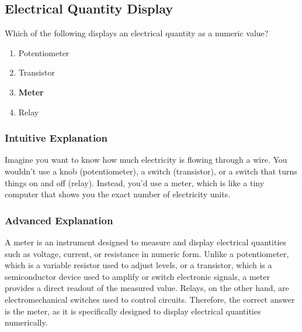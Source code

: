 \subsection{Electrical Quantity Display}
\label{T6D04}

\begin{tcolorbox}[colback=gray!10!white,colframe=black!75!black,title=T6D04]
Which of the following displays an electrical quantity as a numeric value?
\begin{enumerate}[noitemsep]
    \item Potentiometer
    \item Transistor
    \item \textbf{Meter}
    \item Relay
\end{enumerate}
\end{tcolorbox}

\subsubsection*{Intuitive Explanation}
Imagine you want to know how much electricity is flowing through a wire. You wouldn't use a knob (potentiometer), a switch (transistor), or a switch that turns things on and off (relay). Instead, you'd use a meter, which is like a tiny computer that shows you the exact number of electricity units.

\subsubsection*{Advanced Explanation}
A meter is an instrument designed to measure and display electrical quantities such as voltage, current, or resistance in numeric form. Unlike a potentiometer, which is a variable resistor used to adjust levels, or a transistor, which is a semiconductor device used to amplify or switch electronic signals, a meter provides a direct readout of the measured value. Relays, on the other hand, are electromechanical switches used to control circuits. Therefore, the correct answer is the meter, as it is specifically designed to display electrical quantities numerically.